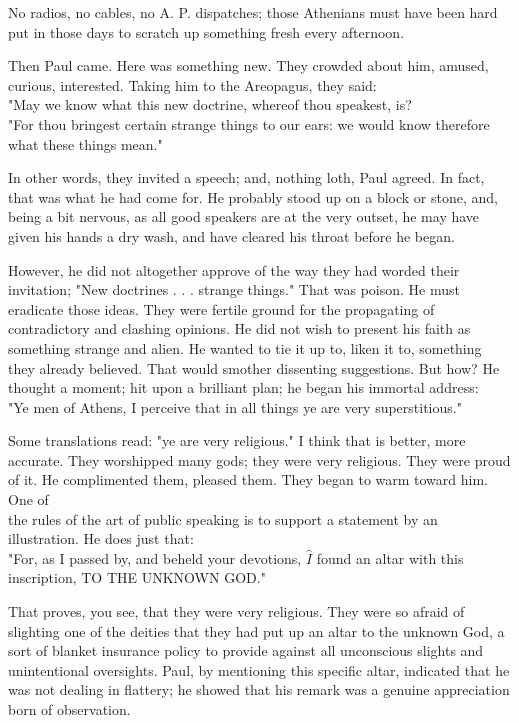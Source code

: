 \documentclass[10pt]{article}
\begin{document}
No radios, no cables, no A. P. dispatches; those Athenians must have been hard put in those days to scratch up something fresh every afternoon.

Then Paul came. Here was something new. They crowded about him, amused, curious, interested. Taking him to the Areopagus, they said:\\
"May we know what this new doctrine, whereof thou speakest, is?\\
"For thou bringest certain strange things to our ears: we would know therefore what these things mean."

In other words, they invited a speech; and, nothing loth, Paul agreed. In fact, that was what he had come for. He probably stood up on a block or stone, and, being a bit nervous, as all good speakers are at the very outset, he may have given his hands a dry wash, and have cleared his throat before he began.

However, he did not altogether approve of the way they had worded their invitation; "New doctrines . . . strange things." That was poison. He must eradicate those ideas. They were fertile ground for the propagating of contradictory and clashing opinions. He did not wish to present his faith as something strange and alien. He wanted to tie it up to, liken it to, something they already believed. That would smother dissenting suggestions. But how? He thought a moment; hit upon a brilliant plan; he began his immortal address:\\
"Ye men of Athens, I perceive that in all things ye are very superstitious."

Some translations read: "ye are very religious." I think that is better, more accurate. They worshipped many gods; they were very religious. They were proud of it. He complimented them, pleased them. They began to warm toward him. One of\\
the rules of the art of public speaking is to support a statement by an illustration. He does just that:\\
"For, as I passed by, and beheld your devotions, $\hat{I}$ found an altar with this inscription, TO THE UNKNOWN GOD."

That proves, you see, that they were very religious. They were so afraid of slighting one of the deities that they had put up an altar to the unknown God, a sort of blanket insurance policy to provide against all unconscious slights and unintentional oversights. Paul, by mentioning this specific altar, indicated that he was not dealing in flattery; he showed that his remark was a genuine appreciation born of observation.
\end{document}
